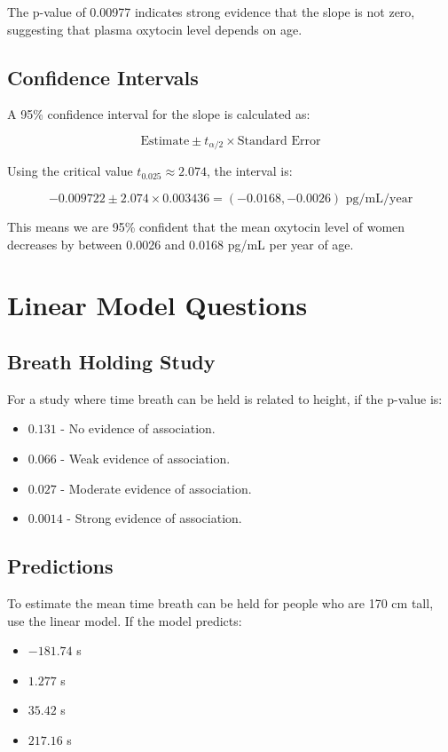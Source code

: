 \documentclass{article}
\begin{document}
The p-value of 0.00977 indicates strong evidence that the slope is not zero, suggesting that plasma oxytocin level depends on age.

\subsection{Confidence Intervals}

A 95\% confidence interval for the slope is calculated as:

\[
\text{Estimate} \pm t_{\alpha/2} \times \text{Standard Error}
\]

Using the critical value \( t_{0.025} \approx 2.074 \), the interval is:

\[
-0.009722 \pm 2.074 \times 0.003436 = (-0.0168, -0.0026) \text{ pg/mL/year}
\]

This means we are 95\% confident that the mean oxytocin level of women decreases by between 0.0026 and 0.0168 pg/mL per year of age.

\section{Linear Model Questions}

\subsection{Breath Holding Study}

For a study where time breath can be held is related to height, if the p-value is:

\begin{itemize}
    \item \(0.131\) - No evidence of association.
    \item \(0.066\) - Weak evidence of association.
    \item \(0.027\) - Moderate evidence of association.
    \item \(0.0014\) - Strong evidence of association.
\end{itemize}

\subsection{Predictions}

To estimate the mean time breath can be held for people who are 170 cm tall, use the linear model. If the model predicts:

\begin{itemize}
    \item \(-181.74\) s
    \item \(1.277\) s
    \item \(35.42\) s
    \item \(217.16\) s
\end{itemize}
\end{document}
